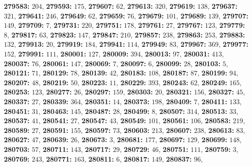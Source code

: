 \textsf{\bfseries 279583:} $204$, \textsf{\bfseries 279593:} $175$, \textsf{\bfseries 279607:} $62$, \textsf{\bfseries 279613:} $320$, \textsf{\bfseries 279619:} $138$, \textsf{\bfseries 279637:} $321$, \textsf{\bfseries 279641:} $246$, \textsf{\bfseries 279649:} $62$, \textsf{\bfseries 279659:} $76$, \textsf{\bfseries 279679:} $101$, \textsf{\bfseries 279689:} $139$, \textsf{\bfseries 279707:} $149$, \textsf{\bfseries 279709:} $7$, \textsf{\bfseries 279731:} $220$, \textsf{\bfseries 279751:} $178$, \textsf{\bfseries 279761:} $27$, \textsf{\bfseries 279767:} $123$, \textsf{\bfseries 279779:} $8$, \textsf{\bfseries 279817:} $63$, \textsf{\bfseries 279823:} $147$, \textsf{\bfseries 279847:} $210$, \textsf{\bfseries 279857:} $238$, \textsf{\bfseries 279863:} $253$, \textsf{\bfseries 279883:} $132$, \textsf{\bfseries 279913:} $20$, \textsf{\bfseries 279919:} $184$, \textsf{\bfseries 279941:} $114$, \textsf{\bfseries 279949:} $83$, \textsf{\bfseries 279967:} $369$, \textsf{\bfseries 279977:} $152$, \textsf{\bfseries 279991:} $111$, \textsf{\bfseries 280001:} $127$, \textsf{\bfseries 280009:} $394$, \textsf{\bfseries 280013:} $97$, \textsf{\bfseries 280031:} $413$, \textsf{\bfseries 280037:} $76$, \textsf{\bfseries 280061:} $147$, \textsf{\bfseries 280069:} $7$, \textsf{\bfseries 280097:} $6$, \textsf{\bfseries 280099:} $28$, \textsf{\bfseries 280103:} $5$, \textsf{\bfseries 280121:} $71$, \textsf{\bfseries 280129:} $78$, \textsf{\bfseries 280139:} $42$, \textsf{\bfseries 280183:} $108$, \textsf{\bfseries 280187:} $87$, \textsf{\bfseries 280199:} $94$, \textsf{\bfseries 280207:} $48$, \textsf{\bfseries 280219:} $50$, \textsf{\bfseries 280223:} $11$, \textsf{\bfseries 280229:} $393$, \textsf{\bfseries 280243:} $62$, \textsf{\bfseries 280249:} $165$, \textsf{\bfseries 280253:} $123$, \textsf{\bfseries 280277:} $26$, \textsf{\bfseries 280297:} $159$, \textsf{\bfseries 280303:} $20$, \textsf{\bfseries 280321:} $156$, \textsf{\bfseries 280327:} $45$, \textsf{\bfseries 280337:} $27$, \textsf{\bfseries 280339:} $364$, \textsf{\bfseries 280351:} $14$, \textsf{\bfseries 280373:} $198$, \textsf{\bfseries 280409:} $7$, \textsf{\bfseries 280411:} $133$, \textsf{\bfseries 280451:} $31$, \textsf{\bfseries 280463:} $145$, \textsf{\bfseries 280487:} $28$, \textsf{\bfseries 280499:} $8$, \textsf{\bfseries 280507:} $314$, \textsf{\bfseries 280513:} $33$, \textsf{\bfseries 280537:} $41$, \textsf{\bfseries 280541:} $27$, \textsf{\bfseries 280547:} $43$, \textsf{\bfseries 280549:} $101$, \textsf{\bfseries 280561:} $106$, \textsf{\bfseries 280583:} $219$, \textsf{\bfseries 280589:} $27$, \textsf{\bfseries 280591:} $155$, \textsf{\bfseries 280597:} $73$, \textsf{\bfseries 280603:} $213$, \textsf{\bfseries 280607:} $238$, \textsf{\bfseries 280613:} $83$, \textsf{\bfseries 280627:} $47$, \textsf{\bfseries 280639:} $26$, \textsf{\bfseries 280673:} $3$, \textsf{\bfseries 280681:} $177$, \textsf{\bfseries 280697:} $129$, \textsf{\bfseries 280699:} $148$, \textsf{\bfseries 280703:} $57$, \textsf{\bfseries 280711:} $143$, \textsf{\bfseries 280717:} $29$, \textsf{\bfseries 280729:} $46$, \textsf{\bfseries 280751:} $111$, \textsf{\bfseries 280759:} $3$, \textsf{\bfseries 280769:} $243$, \textsf{\bfseries 280771:} $163$, \textsf{\bfseries 280811:} $6$, \textsf{\bfseries 280817:} $149$, \textsf{\bfseries 280837:} $96$, 
